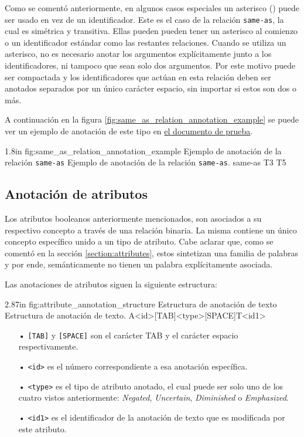 Como se comentó anteriormente, en algunos casos especiales un asterisco (\doublequote{\,*\,}) puede ser usado en vez de un identificador. Este es el caso de la relación \texttt{same-as}, la cual es simétrica y transitiva. Ellas pueden pueden tener un asterisco al comienzo o un identificador estándar como las restantes relaciones. Cuando se utiliza un asterisco, no es necesario anotar los argumentos explícitamente junto a los identificadores, ni tampoco que sean solo dos argumentos. Por este motivo puede ser compactada y los identificadores que actúan en esta relación deben ser anotados separados por un único carácter espacio, sin importar si estos son dos o más.

A continuación en la figura \ref{fig:same_as_relation_annotation_example} se puede ver un ejemplo de anotación de este tipo en \hyperref[sentence:annotation_example]{el documento de prueba}.

\begin{annexample}
	[backgroundcolor=cyan!13]
	{1.8in}
	{fig:same_as_relation_annotation_example}
	{Ejemplo de anotación de la relación \texttt{same-as}}
	{Ejemplo de anotación de la relación \texttt{same-as}.}
	\textasteriskcentered\space\space\space same-as T3 T5
\end{annexample}

\subsection{Anotación de atributos}
Los atributos booleanos anteriormente mencionados, son asociados a su respectivo concepto a través de una relación binaria. La misma contiene un único concepto específico unido a un tipo de atributo. Cabe aclarar que, como se comentó en la sección \ref{section:attributes}, estos sintetizan una familia de palabras y por ende, semánticamente no tienen un palabra explícitamente asociada.

Las anotaciones de atributos siguen la siguiente estructura:

\begin{annexample}
	[backgroundcolor=green!13]
	{2.87in}
	{fig:attribute_annotation_structure}
	{Estructura de anotación de texto}
	{Estructura de anotación de texto.}
	A<id>[TAB]<type>[SPACE]T<id1>
\end{annexample}

\vspace{-0.2in}
\begin{itemize}
	\item[•] \texttt{[TAB]} y \texttt{[SPACE]} son el carácter TAB y el carácter espacio respectivamente.
	\item[•] \texttt{<id>} es el número correspondiente a esa anotación específica.
	\item[•] \texttt{<type>} es el tipo de atributo anotado, el cual puede ser solo uno de los cuatro vistos anteriormente: {\it Negated}, {\it Uncertain}, {\it Diminished} o {\it Emphasized}.
	\item[•] \texttt{<id1>} es el identificador de la anotación de texto que es modificada por este atributo.
\end{itemize}

